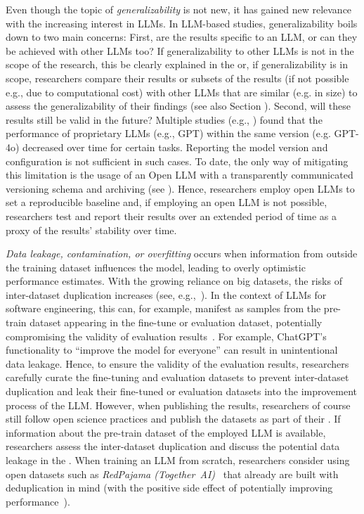 Even though the topic of \emph{generalizability} is not new, it has gained new relevance with the increasing interest in LLMs. In LLM-based studies, generalizability boils down to two main concerns:
First, are the results specific to an LLM, or can they be achieved with other LLMs too? 
If generalizability to other LLMs is not in the scope of the research, this \must be clearly explained in the \paper or, if generalizability is in scope, researchers \must compare their results or subsets of the results (if not possible e.g., due to computational cost) with other LLMs that are similar (e.g. in size) to assess the generalizability of their findings (see also Section \openllm).
Second, will these results still be valid in the future?
Multiple studies (e.g., \cite{DBLP:journals/corr/abs-2307-09009, doi:10.1148/radiol.232411}) found that the performance of proprietary LLMs (e.g., GPT) within the same version (e.g. GPT-4o) decreased over time for certain tasks.
Reporting the model version and configuration is not sufficient in such cases. To date, the only way of mitigating this limitation is the usage of an Open LLM with a transparently communicated versioning schema and archiving (see \openllm). Hence, researchers \should employ open LLMs to set a reproducible baseline and, if employing an open LLM is not possible, researchers \should test and report their results over an extended period of time as a proxy of the results' stability over time.

\emph{Data leakage, contamination, or overfitting} occurs when information from outside the training dataset influences the model, leading to overly optimistic performance estimates.
With the growing reliance on big datasets, the risks of inter-dataset duplication increases (see, e.g.,~\cite{DBLP:journals/pacmpl/LopesMMSYZSV17, DBLP:conf/oopsla/Allamanis19}). 
In the context of LLMs for software engineering, this can, for example, manifest as samples from the pre-train dataset appearing in the fine-tune or evaluation dataset, potentially compromising the validity of evaluation results~\cite{DBLP:journals/tse/LopezCSSV25}.
For example, ChatGPT's functionality to ``improve the model for everyone'' can result in unintentional data leakage.
Hence, to ensure the validity of the evaluation results, researchers \should carefully curate the fine-tuning and evaluation datasets to prevent inter-dataset duplication and \mustnot leak their fine-tuned or evaluation datasets into the improvement process of the LLM.
However, when publishing the results, researchers \should of course still follow open science practices and publish the datasets as part of their \supplementarymaterial.
If information about the pre-train dataset of the employed LLM is available, researchers \should assess the inter-dataset duplication and \must discuss the potential data leakage in the \paper.
When training an LLM from scratch, researchers \may consider using open datasets such as \emph{RedPajama (Together~AI)}~\cite{together2023redpajama} that already are built with deduplication in mind (with the positive side effect of potentially improving performance~\cite{DBLP:conf/acl/LeeINZECC22}).


